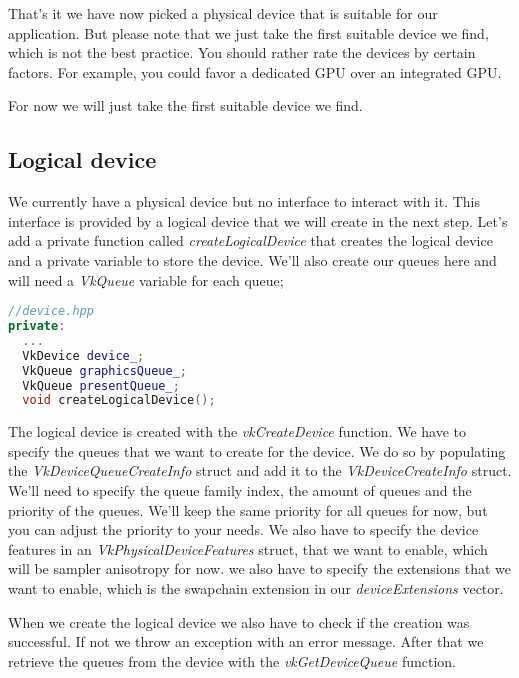 \documentclass[12pt]{report} \usepackage{preamble}
\begin{document}
That's it we have now picked a physical device that is suitable for our application. But please note that
we just take the first suitable device we find, which is not the best practice. You should rather
rate the devices by certain factors. For example, you could favor a dedicated \ac{GPU} over an integrated \ac{GPU}.

For now we will just take the first suitable device we find.

\subsection{Logical device}

We currently have a physical device but no interface to interact with it. This interface is provided
by a logical device that we will create in the next step. Let's add a private function called
\textit{createLogicalDevice} that creates the logical device and a private variable to store the device.
We'll also create our queues here and will need a \textit{VkQueue} variable for each queue;

\begin{lstlisting}[language=C++]
//device.hpp
private:
  ...
  VkDevice device_;
  VkQueue graphicsQueue_;
  VkQueue presentQueue_;
  void createLogicalDevice();
\end{lstlisting}

The logical device is created with the \textit{vkCreateDevice} function. We have to specify the
queues that we want to create for the device. We do so by populating the \textit{VkDeviceQueueCreateInfo}
struct and add it to the \textit{VkDeviceCreateInfo} struct. We'll need to specify the queue family index,
the amount of queues and the priority of the queues. We'll keep the same priority for all queues for now,
but you can adjust the priority to your needs. We also have to specify the device features in an
\textit{VkPhysicalDeviceFeatures} struct, that we want to enable, which will be sampler anisotropy for now.
we also have to specify the extensions that we want to enable,
which is the swapchain extension in our \textit{deviceExtensions} vector.

When we create the logical device we also have to check if the creation was successful. If not we throw
an exception with an error message. After that we retrieve the queues from the device with the
\textit{vkGetDeviceQueue} function.
\end{document}
